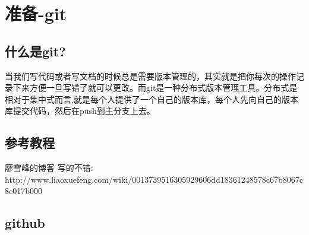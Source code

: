 \section{准备-git}
\subsection{什么是git?}
当我们写代码或者写文档的时候总是需要版本管理的，其实就是把你每次的操作记录下来方便一旦写错了就可以更改。而git是一种分布式版本管理工具。分布式是相对于集中式而言,就是每个人提供了一个自己的版本库，每个人先向自己的版本库提交代码，然后在push到主分支上去。\par

\subsection{参考教程}
廖雪峰的博客 写的不错:\\http://www.liaoxuefeng.com/wiki/001373\newline9516305929606dd18361248578c67b8067c8c017b000
\subsection{github}

